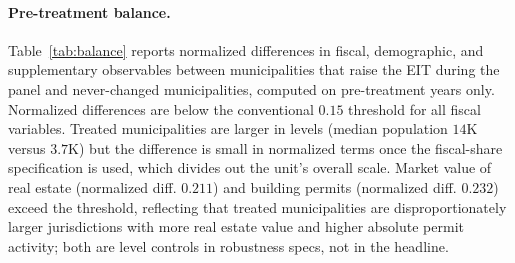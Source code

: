 \documentclass[12pt]{article}
\begin{document}
\paragraph{Pre-treatment balance.}
Table~\ref{tab:balance} reports normalized differences in fiscal,
demographic, and supplementary observables between municipalities
that raise the EIT during the panel and never-changed
municipalities, computed on pre-treatment years only. Normalized
differences are below the conventional $0.15$ threshold for all
fiscal variables. Treated municipalities are larger in levels (median
population $14$K versus $3.7$K) but the difference is small in
normalized terms once the fiscal-share specification is used, which
divides out the unit's overall scale. Market value of real estate
(normalized diff. $0.211$) and building permits (normalized diff.
$0.232$) exceed the threshold, reflecting that treated municipalities are
disproportionately larger jurisdictions with more real estate value
and higher absolute permit activity; both are level controls in
robustness specs, not in the headline.
\end{document}
